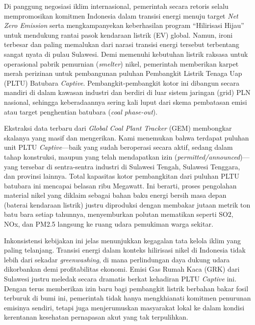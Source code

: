 \documentclass[
]{article}
\begin{document}
Di panggung negosiasi iklim internasional, pemerintah secara retoris
selalu mempromosikan komitmen Indonesia dalam transisi energi menuju
target \emph{Net Zero Emission} serta mengkampanyekan keberhasilan
program ``Hilirisasi Hijau'' untuk mendukung rantai pasok kendaraan
listrik (EV) global. Namun, ironi terbesar dan paling memalukan dari
narasi transisi energi tersebut terbentang sangat nyata di pulau
Sulawesi. Demi memenuhi kebutuhan listrik raksasa untuk operasional
pabrik pemurnian (\emph{smelter}) nikel, pemerintah memberikan karpet
merah perizinan untuk pembangunan puluhan Pembangkit Listrik Tenaga Uap
(PLTU) Batubara \emph{Captive}. Pembangkit-pembangkit kotor ini dibangun
secara mandiri di dalam kawasan industri dan berdiri di luar sistem
jaringan (grid) PLN nasional, sehingga keberadaannya sering kali luput
dari skema pembatasan emisi atau target penghentian batubara (\emph{coal
phase-out}).

Ekstraksi data terbaru dari \emph{Global Coal Plant Tracker} (GEM)
membongkar skalanya yang masif dan mengerikan. Kami menemukan bahwa
terdapat puluhan unit PLTU \emph{Captive}---baik yang sudah beroperasi
secara aktif, sedang dalam tahap konstruksi, maupun yang telah
mendapatkan izin (\emph{permitted/announced})---yang tersebar di
sentra-sentra industri di Sulawesi Tengah, Sulawesi Tenggara, dan
provinsi lainnya. Total kapasitas kotor pembangkitan dari puluhan PLTU
batubara ini mencapai belasan ribu Megawatt. Ini berarti, proses
pengolahan material nikel yang diklaim sebagai bahan baku energi bersih
masa depan (baterai kendaraan listrik) justru diproduksi dengan membakar
jutaan metrik ton batu bara setiap tahunnya, menyemburkan polutan
mematikan seperti SO2, NOx, dan PM2.5 langsung ke ruang udara pemukiman
warga sekitar.

Inkonsistensi kebijakan ini jelas menunjukkan kegagalan tata kelola
iklim yang paling telanjang. Transisi energi dalam konteks hilirisasi
nikel di Indonesia tidak lebih dari sekadar \emph{greenwashing}, di mana
perlindungan daya dukung udara dikorbankan demi profitabilitas ekonomi.
Emisi Gas Rumah Kaca (GRK) dari Sulawesi justru meledak secara dramatis
berkat kehadiran PLTU \emph{Captive} ini. Dengan terus memberikan izin
baru bagi pembangkit listrik berbahan bakar fosil terburuk di bumi ini,
pemerintah tidak hanya mengkhianati komitmen penurunan emisinya sendiri,
tetapi juga menjerumuskan masyarakat lokal ke dalam kondisi kerentanan
kesehatan pernapasan akut yang tak terpulihkan.
\end{document}
